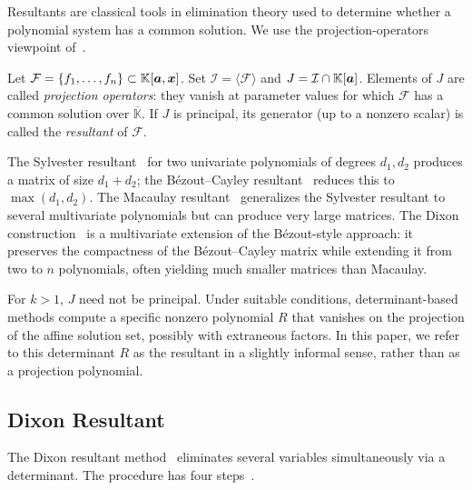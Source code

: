 Resultants are classical tools in elimination theory used to determine whether a polynomial system has a common solution. We use the projection-operators viewpoint of~\cite{DBLP:conf/issac/KapurS97}.

\begin{definition}\label{Definition:Resultant}
Let $\mathcal{F}=\{f_1,\dots,f_n\}\subset\mathbb{K}[{\boldsymbol{a}},{\boldsymbol{x}}]$. Set $\mathcal{I}=\langle\mathcal{F}\rangle$ and $J=\mathcal{I}\cap\mathbb{K}[{\boldsymbol{a}}]$. Elements of $J$ are called \emph{projection operators}: they vanish at parameter values for which $\mathcal{F}$ has a common solution over $\overline{\mathbb{K}}$. If $J$ is principal, its generator (up to a nonzero scalar) is called the \emph{resultant} of $\mathcal{F}$.
\end{definition}


The Sylvester resultant~\cite{cox2005using,Villard2018} for two univariate polynomials of degrees $d_1,d_2$ produces a matrix of size $d_1+d_2$; the B\'ezout--Cayley resultant~\cite{painvin1874note,cox2005using} reduces this to $\max(d_1,d_2)$. The Macaulay resultant~\cite{macaulay1902some} generalizes the Sylvester resultant to several multivariate polynomials but can produce very large matrices. The Dixon construction~\cite{Dixon1909} is a multivariate extension of the B\'ezout-style approach: it preserves the compactness of the B\'ezout--Cayley matrix while extending it from two to $n$ polynomials, often yielding much smaller matrices than Macaulay.

\begin{remark}\label{rem:projective_vs_affine}
	For $k > 1$, $J$ need not be principal. Under suitable conditions,  determinant-based methods compute a specific nonzero polynomial $R$ that vanishes on the projection of the affine solution set, possibly with extraneous factors. In this paper, we refer to this determinant $R$ as the resultant in a slightly informal sense, rather than as a projection polynomial.
\end{remark}

\subsection{Dixon Resultant}\label{sec2.3:Dixon}
The Dixon resultant method~\cite{Dixon1909,DBLP:conf/issac/KapurSY94} eliminates several variables simultaneously via a determinant. The procedure has four steps~\cite{DBLP:conf/issac/KapurSY94,JinaduMonagan2025}.

